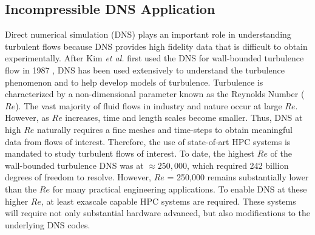\subsection{Incompressible DNS Application}
\label{sec:dns_full}

Direct numerical simulation (DNS) plays an important role in
understanding turbulent flows because DNS provides high fidelity data 
that is difficult to obtain experimentally. After Kim {\it et al.}
first used the DNS for wall-bounded turbulence flow in 1987
\cite{Kim:1987ub}, DNS has been used extensively to understand the
turbulence phenomenon and to help develop models of turbulence. 
Turbulence is characterized by a non-dimensional parameter known 
as the Reynolds Number ($Re$).  The vast majority of fluid flows 
in industry and nature occur at large $Re$. 
However, as $Re$ increases, time and length scales become smaller. 
Thus, DNS at high $Re$ naturally requires a fine meshes and time-steps 
to obtain meaningful data from flows of interest. 
Therefore, the use of state-of-art HPC systems is mandated
 to study turbulent flows of interest. To date, the highest
$Re$ of the wall-bounded turbulence DNS was at $\approx 250,000$, 
which required 242 billion degrees of freedom to 
resolve\cite{Lee:2015er}. However, $Re$ = 250,000 remains substantially 
lower than the $Re$  for many practical engineering applications. 
To enable DNS at these higher $Re$, at least exascale 
capable HPC systems are required. These systems will require
not only substantial hardware advanced, but also modifications 
to the underlying DNS codes. 

